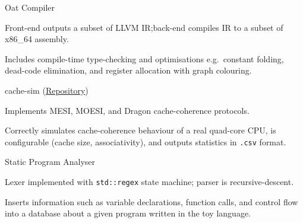 \begin{cventries}
	{Oat Compiler} %
	{} %
	{} %
	{
		\begin{cvitems} %
			\item Front-end outputs a subset of LLVM IR;\@ back-end compiles IR to a subset of x86\_64 assembly.
			\item Includes compile-time type-checking and optimisations e.g.\ constant folding, dead-code elimination, and register allocation with graph colouring.
		\end{cvitems}
	}


	{cache-sim \footnotesize(\href{https://github.com/sharadhr/cs4223-cache-sim}{Repository})} %
	{} %
	{} %
	{
		\begin{cvitems} %
			\item Implements MESI, MOESI, and Dragon cache-coherence protocols.
			\item Correctly simulates cache-coherence behaviour of a real quad-core CPU, is configurable (cache size, associativity), and outputs statistics in \texttt{.csv} format.
		\end{cvitems}
	}


	{Static Program Analyser} %
	{} %
	{} %
	{
		\begin{cvitems} %
			\item Lexer implemented with \texttt{std::regex} state machine; parser is recursive-descent.
			\item Inserts information such as variable declarations, function calls, and control flow into a database about a given program written in the toy language.
		\end{cvitems}
	}

\end{cventries}

